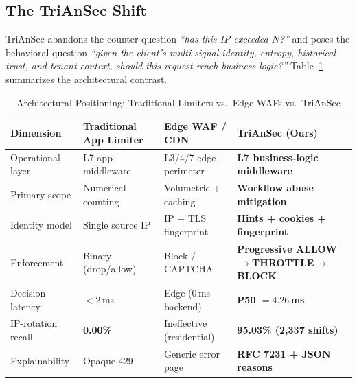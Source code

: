 \documentclass[journal,10pt]{IEEEtran}
\begin{document}
\subsection{The TriAnSec Shift}
TriAnSec abandons the counter question \emph{``has this IP exceeded $N$?''} and poses the behavioral question \emph{``given the client's multi-signal identity, entropy, historical trust, and tenant context, should this request reach business logic?''} Table~\ref{tab:comparison} summarizes the architectural contrast.

\begin{table}[!t]
\centering
\caption{Architectural Positioning: Traditional Limiters vs.\ Edge WAFs vs.\ TriAnSec}
\label{tab:comparison}
\renewcommand{\arraystretch}{1.18}
\begin{tabularx}{\textwidth}{@{}lXXX@{}}
\toprule
\textbf{Dimension} & \textbf{Traditional App Limiter} & \textbf{Edge WAF / CDN} & \textbf{TriAnSec (Ours)} \\
\midrule
Operational layer     & L7 app middleware              & L3/4/7 edge perimeter         & \textbf{L7 business-logic middleware} \\
Primary scope         & Numerical counting             & Volumetric + caching          & \textbf{Workflow abuse mitigation} \\
Identity model        & Single source IP               & IP + TLS fingerprint          & \textbf{Hints + cookies + fingerprint} \\
Enforcement           & Binary (drop/allow)            & Block / CAPTCHA               & \textbf{Progressive ALLOW$\to$THROTTLE$\to$BLOCK} \\
Decision latency      & $<2$\,ms                       & Edge ($0$\,ms backend)        & \textbf{P50 $=4.26$\,ms} \\
IP-rotation recall    & \textbf{0.00\%}                & Ineffective (residential)     & \textbf{95.03\% (2,337 shifts)} \\
Explainability        & Opaque 429                     & Generic error page            & \textbf{RFC 7231 + JSON reasons} \\
\bottomrule
\end{tabularx}
\end{table}
\end{document}
